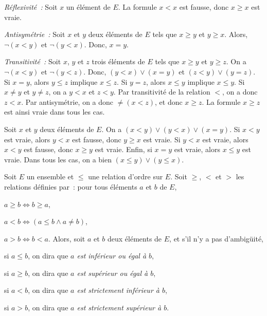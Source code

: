 \noindent{} 
\startitemize[nowhite]
    \item \emph{Réflexivité :} Soit $x$ un élément de $E$. 
        La formule $x < x$ est fausse, donc $x \geq x$ est vraie. 
    \item \emph{Antisymétrie :} Soit $x$ et $y$ deux éléments de $E$ tels que $x \geq y$ et $y \geq x$. 
        Alors, $\lnot (x < y)$ et $\lnot (y < x)$. 
        Donc, $x = y$.
    \item \emph{Transitivité :} Soit $x$, $y$ et $z$ trois éléments de $E$ tels que $x \geq y$ et $y \geq z$. 
        On a $\lnot (x < y)$ et $\lnot (y < z)$. 
        Donc, $(y < x) \vee (x = y)$ et $(z < y) \vee (y = z)$. 
        Si $x = y$, alors $y \leq z$ implique $x \leq z$.
        Si $y = z$, alors $x \leq y$ implique $x \leq y$.
        Si $x \neq y$ et $y \neq z$, on a $y < x$ et $z < y$. 
        Par transitivité de la relation $<$, on a donc $z < x$. 
        Par antisymétrie, on a donc $\neq (x < z)$, et donc $x \geq z$. 
        La formule $x \geq z$ est ainsi vraie dans tous les cas. 
    \item Soit $x$ et $y$ deux éléments de $E$. 
        On a $(x < y) \vee (y < x) \vee (x = y)$. 
        Si $x < y$ est vraie, alors $y < x$ est fausse, donc $y \geq x$ est vraie.
        Si $y < x$ est vraie, alors $x < y$ est fausse, donc $x \geq y$ est vraie.
        Enfin, si $x = y$ est vraie, alors $x \leq y$ est vraie. 
        Dans tous les cas, on a bien $(x \leq y) \vee (y \leq x)$.
\stopitemize

\blank[medium]

\noindent{} Soit $E$ un ensemble et $\leq$ une relation d'ordre sur $E$. 
    Soit $\geq$, $<$ et $>$ les relations définies par : pour tous éléments $a$ et $b$ de $E$, 
    \startitemize[nowhite]
        \item $a \geq b \Leftrightarrow b \geq a$,
        \item $a < b \Leftrightarrow ( a \leq b \wedge a \neq b )$,
        \item $a > b \Leftrightarrow b < a$.
    \stopitemize
    Alors, soit $a$ et $b$ deux éléments de $E$, et s'il n'y a pas d'ambigüité, 
    \startitemize[nowhite]
        \item si $a \leq b$, on dira que \emph{$a$ est inférieur ou égal à $b$}, 
        \item si $a \geq b$, on dira que \emph{$a$ est supérieur ou égal à $b$}, 
        \item si $a < b$, on dira que \emph{$a$ est strictement inférieur à $b$}, 
        \item si $a > b$, on dira que \emph{$a$ est strictement supérieur à $b$}.
    \stopitemize

